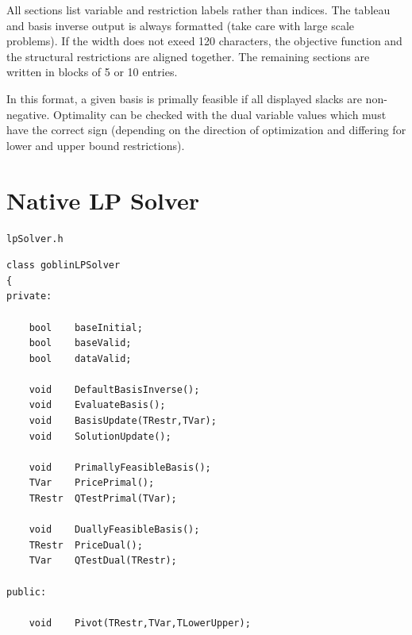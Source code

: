 \documentclass[a4paper,11pt,twoside]{book}
\begin{document}
\begin{multicols}{2}
All sections list variable and restriction labels rather than indices. The
tableau and basis inverse output is always formatted (take care with large
scale problems). If the width does not exeed 120 characters, the objective
function and the structural restrictions are aligned together. The remaining
sections are written in blocks of 5 or 10 entries.

In this format, a given basis is primally feasible if all displayed slacks are
non-negative. Optimality can be checked with the dual variable values which
must have the correct sign (depending on the direction of optimization and
differing for lower and upper bound restrictions).


\newpage
{}
\section{Native LP Solver}
\myinclude\verb/lpSolver.h/
\begin{mymethods}
\begin{verbatim}
class goblinLPSolver
{
private:

    bool    baseInitial;
    bool    baseValid;
    bool    dataValid;

    void    DefaultBasisInverse();
    void    EvaluateBasis();
    void    BasisUpdate(TRestr,TVar);
    void    SolutionUpdate();
    
    void    PrimallyFeasibleBasis();
    TVar    PricePrimal();
    TRestr  QTestPrimal(TVar);
    
    void    DuallyFeasibleBasis();
    TRestr  PriceDual();
    TVar    QTestDual(TRestr);

public:

    void    Pivot(TRestr,TVar,TLowerUpper);
    

\end{verbatim}
\end{mymethods}
\end{multicols}
\end{document}
